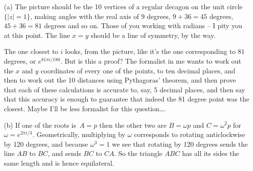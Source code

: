 \documentclass[10pt]{article}
\begin{document}
\medskip{} (a) The picture should be the 10 vertices of a regular decagon on the unit circle $\{|z|=1\}$, making angles with the real axis of $9$ degrees, $9+36=45$ degrees, $45+36=81$ degrees and so on. Those of you working with radians -- I pity you at this point. The line $x=y$ should be a line of symmetry, by the way.

The one closest to $i$ looks, from the picture, like it's the one corresponding to $81$ degrees, or $e^{81\pi i/180}$. But is this a proof? The formalist in me wants to work out the $x$ and $y$ coordinates of every one of the points, to ten decimal places, and then to work out the 10 distances using Pythagoras' theorem, and then prove that each of these calculations is accurate to, say, 5 decimal places, and then say that this accuracy is enough to guarantee that indeed the 81 degree point was the closest. Maybe I'll be less formalist for this question\ldots.

(b) If one of the roots is~$A=p$ then the other two are $B=\omega p$ and $C=\omega^2 p$ for $\omega=e^{2\pi i/3}$. Geometrically, multiplying by $\omega$ corresponds to rotating anticlockwise by 120 degrees, and because $\omega^3=1$ we see that rotating by 120 degrees sends the line $AB$ to $BC$, and sends $BC$ to $CA$. So the triangle $ABC$ has all its sides the same length and is hence equilateral.
\end{document}
